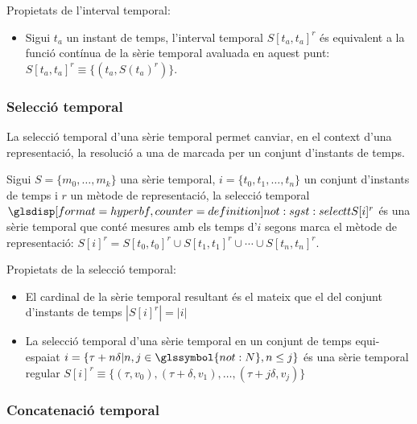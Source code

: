 Propietats de l'interval temporal:

\begin{itemize}
\item Sigui $t_a$ un instant de temps, l'interval temporal
  $S[t_a,t_a]^r$ és equivalent a la funció contínua de la sèrie
  temporal avaluada en aquest punt: $S[t_a,t_a]^r\equiv \{(t_a,
  S(t_a)^r)\}$.


\end{itemize}




\subsubsection{Selecció temporal}


La selecció  temporal d'una sèrie temporal permet canviar, en el
context d'una representació, la resolució a una de marcada per un
conjunt d'instants de temps. 


\begin{definition}
  \label{def:sgst:selecciot}
  Sigui $S=\{m_0, \ldots, m_k\}$ una sèrie temporal,
  $i=\{t_0,t_1,\dotsc,t_n\}$ un conjunt d'instants de temps i $r$ un
  mètode de representació, la selecció temporal
  $\glsdispdef{not:sgst:selectt}{S[i]^r}$ és una sèrie temporal que
  conté mesures amb els temps d'$i$ segons marca el mètode de
  representació: $S[i]^r= S[t_0,t_0]^r \cup S[t_1,t_1]^r \cup \dotsb
  \cup S[t_n,t_n]^r$.
\end{definition}



Propietats de la selecció temporal:
\begin{itemize}

\item El cardinal de la sèrie temporal resultant és el mateix que el
  del conjunt d'instants de temps $|S[i]^r| = |i|$

\item La selecció temporal d'una sèrie temporal en un conjunt de temps
  equi-espaiat $i = \{\tau+n\delta | n,j\in\glssymbol{not:N}, n\leq j
  \}$ és una sèrie temporal regular $S[i]^r \equiv \{ (\tau, v_0),
  (\tau+\delta,v_1), \dotsc , (\tau+j\delta,v_j)\}$
\end{itemize}




\subsubsection{Concatenació temporal}

